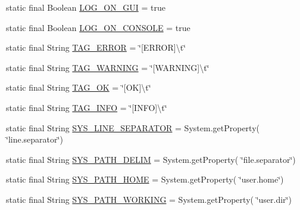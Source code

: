 \begin{DoxyCompactItemize}
static final Boolean \hyperlink{classit_1_1emarolab_1_1cagg_1_1debugging_1_1DebuggingDefaults_a82d4435a02f409eff194853e9ae63499}{L\-O\-G\-\_\-\-O\-N\-\_\-\-G\-U\-I} = true
\item 
static final Boolean \hyperlink{classit_1_1emarolab_1_1cagg_1_1debugging_1_1DebuggingDefaults_a367caf2dc8777f38b40c160b848cafe0}{L\-O\-G\-\_\-\-O\-N\-\_\-\-C\-O\-N\-S\-O\-L\-E} = true
\item 
static final String \hyperlink{classit_1_1emarolab_1_1cagg_1_1debugging_1_1DebuggingDefaults_a573cd0445233309d6c021ddf46e23f7f}{T\-A\-G\-\_\-\-E\-R\-R\-O\-R} = \char`\"{}\mbox{[}E\-R\-R\-O\-R\mbox{]}\textbackslash{}t\char`\"{}
\item 
static final String \hyperlink{classit_1_1emarolab_1_1cagg_1_1debugging_1_1DebuggingDefaults_a404289c07e43a1d8bbbb5386a8350fea}{T\-A\-G\-\_\-\-W\-A\-R\-N\-I\-N\-G} = \char`\"{}\mbox{[}W\-A\-R\-N\-I\-N\-G\mbox{]}\textbackslash{}t\char`\"{}
\item 
static final String \hyperlink{classit_1_1emarolab_1_1cagg_1_1debugging_1_1DebuggingDefaults_a34e7b6f2dc08c81c1c01f76c675df1e5}{T\-A\-G\-\_\-\-O\-K} = \char`\"{}\mbox{[}O\-K\mbox{]}\textbackslash{}t\char`\"{}
\item 
static final String \hyperlink{classit_1_1emarolab_1_1cagg_1_1debugging_1_1DebuggingDefaults_a0479528bb8c46a8159792c7f656ad135}{T\-A\-G\-\_\-\-I\-N\-F\-O} = \char`\"{}\mbox{[}I\-N\-F\-O\mbox{]}\textbackslash{}t\char`\"{}
\item 
static final String \hyperlink{classit_1_1emarolab_1_1cagg_1_1debugging_1_1DebuggingDefaults_a5fc80b23dc9aafafd985eb9b71f94dbc}{S\-Y\-S\-\_\-\-L\-I\-N\-E\-\_\-\-S\-E\-P\-A\-R\-A\-T\-O\-R} = System.\-get\-Property( \char`\"{}line.\-separator\char`\"{})
\item 
static final String \hyperlink{classit_1_1emarolab_1_1cagg_1_1debugging_1_1DebuggingDefaults_a7c9d7fb448feba26f1848cd81cedbc3f}{S\-Y\-S\-\_\-\-P\-A\-T\-H\-\_\-\-D\-E\-L\-I\-M} = System.\-get\-Property( \char`\"{}file.\-separator\char`\"{})
\item 
static final String \hyperlink{classit_1_1emarolab_1_1cagg_1_1debugging_1_1DebuggingDefaults_ae8b28f456d0e6190b071bf29fa2793d7}{S\-Y\-S\-\_\-\-P\-A\-T\-H\-\_\-\-H\-O\-M\-E} = System.\-get\-Property( \char`\"{}user.\-home\char`\"{})
\item 
static final String \hyperlink{classit_1_1emarolab_1_1cagg_1_1debugging_1_1DebuggingDefaults_ac2710a46c5c4c629928170fa5e90095d}{S\-Y\-S\-\_\-\-P\-A\-T\-H\-\_\-\-W\-O\-R\-K\-I\-N\-G} = System.\-get\-Property( \char`\"{}user.\-dir\char`\"{})

\end{DoxyCompactItemize}
